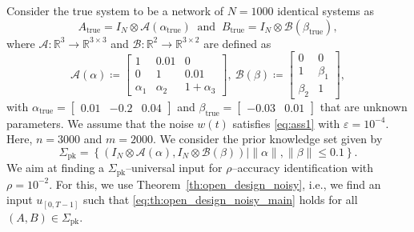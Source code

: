 \documentclass[journal,twoside,web]{ieeecolor}
\newcommand{\set}[2]{\left\{#1 \mid #2\right\}}
\begin{document}
Consider the true system to be a network of $N=1000$ identical systems as
\begin{equation}
A_\text{true}=I_N\otimes \mathcal{A}(\alpha_\text{true})\ \text{ and }\ B_\text{true}=I_N\otimes \mathcal{B}(\beta_\text{true}),
\end{equation}
where $\mathcal{A}:\mathbb{R}^3\rightarrow\mathbb{R}^{3\times 3}$ and $\mathcal{B}:\mathbb{R}^2\rightarrow\mathbb{R}^{3\times 2}$ are defined as
\begin{equation}
\mathcal{A}(\alpha)\!\coloneqq\!\begin{bmatrix}
1 & 0.01 & 0 \\
0 & 1 & 0.01 \\
\alpha_1 & \alpha_2 & 1+\alpha_3
\end{bmatrix},\ \mathcal{B}(\beta)\!\coloneqq\!\begin{bmatrix}
0 & 0 \\
1 & \beta_1 \\
\beta_2 & 1
\end{bmatrix},
\end{equation}
with $\alpha_\text{true}=\begin{bmatrix}
0.01 & -0.2 & 0.04
\end{bmatrix}$ and $\beta_\text{true}=\begin{bmatrix}
-0.03 & 0.01
\end{bmatrix}$ that are unknown parameters. We assume that the noise $w(t)$ satisfies \eqref{eq:ass1} with $\varepsilon=10^{-4}$. Here, $n=3000$ and $m=2000$. We consider the prior knowledge set given by
\begin{equation}
\Sigma_\text{pk}=\set{(I_N\otimes \mathcal{A}(\alpha),I_N\otimes \mathcal{B}(\beta))}{\|\alpha\|,\|\beta\|\leq 0.1}.
\end{equation}
We aim at finding a $\Sigma_\text{pk}$--universal input for $\rho$--accuracy identification with $\rho=10^{-2}$. For this, we use Theorem~\ref{th:open_design_noisy}, i.e., we find an input $u_{[0,T-1]}$ such that \eqref{eq:th:open_design_noisy_main} holds for all $(A,B)\in\Sigma_\text{pk}$. 
\end{document}

